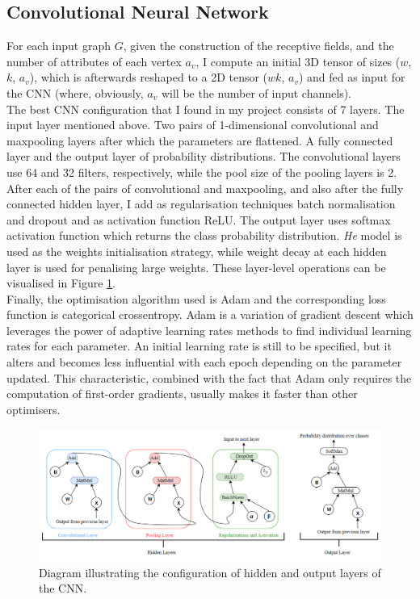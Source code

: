 \subsection{Convolutional Neural Network}

For each input graph $G$, given the construction of the receptive fields, and the number of attributes of each vertex $a_v$, I compute an initial 3D tensor of sizes ($w$, $k$, $a_v$), which is afterwards reshaped to a 2D tensor ($wk$, $a_v$) and fed as input for the CNN (where, obviously, $a_v$ will be the number of input channels). \\

The best CNN configuration that I found in my project consists of 7 layers. The input layer mentioned above. Two pairs of 1-dimensional convolutional and maxpooling layers after which the parameters are flattened. A fully connected layer and the output layer of probability distributions. The convolutional layers use 64 and 32 filters, respectively, while the pool size of the pooling layers is 2. \\

After each of the pairs of convolutional and maxpooling, and also after the fully connected hidden layer, I add as regularisation techniques batch normalisation and dropout and as activation function ReLU. The output layer uses softmax activation function which returns the class probability distribution. \textit{He} model is used as the weights initialisation strategy, while weight decay at each hidden layer is used for penalising large weights. These layer-level operations can be visualised in Figure \ref{cnn_layers}. \\

Finally, the optimisation algorithm used is Adam and the corresponding loss function is categorical crossentropy. Adam is a variation of gradient descent which leverages the power of adaptive learning rates methods to find individual learning rates for each parameter. An initial learning rate is still to be specified, but it alters and becomes less influential with each epoch depending on the parameter updated. This characteristic, combined with the fact that Adam only requires the computation of first-order gradients, usually makes it faster than other optimisers.  \\


\begin{figure}[H]
  \centering
  \centerline{\includegraphics[scale=0.6]{Images/cnn_layers.png}}
  \caption{Diagram illustrating the configuration of hidden and output layers of the CNN.}
  \label{cnn_layers}
\end{figure}


